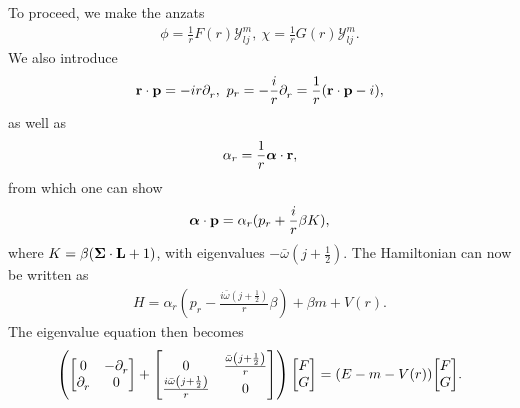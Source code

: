 To proceed, we make the anzats
\begin{align*}
	\phi = \frac{1}{r}F(r)\mathcal{Y}^{m}_{lj},\ \chi = \frac{1}{r}G(r)\mathcal{Y}^{m}_{lj}.
\end{align*}
We also introduce
\begin{align*}
	\vb{r}\cdot\vb{p} = -ir\partial^{}_{r},\ p_{r} = -\frac{i}{r}\partial^{}_{r} = \frac{1}{r}(\vb{r}\cdot\vb{p} - i),
\end{align*}
as well as
\begin{align*}
	\alpha_{r} = \frac{1}{r}\vb*{\alpha}\cdot\vb{r},
\end{align*}
from which one can show
\begin{align*}
	\vb*{\alpha}\cdot\vb{p} = \alpha_{r}(p_{r} + \frac{i}{r}\beta K),
\end{align*}
where $K = \beta(\vb*{\Sigma}\cdot\vb{L} + 1)$, with eigenvalues $-\bar{\omega}\left(j + \frac{1}{2}\right)$. The Hamiltonian can now be written as
\begin{align*}
	H = \alpha_{r}(p_{r} - \frac{i\bar{\omega}\left(j + \frac{1}{2}\right)}{r}\beta) + \beta m + V(r).
\end{align*}
The eigenvalue equation then becomes
\begin{align*}
	\left(\mqty[
		0           & -\del{}{r}{} \\
		\del{}{r}{} & 0
	] + \mqty[
		0                                                   & \frac{\bar{\omega}\left(j + \frac{1}{2}\right)}{r} \\
		\frac{i\bar{\omega}\left(j + \frac{1}{2}\right)}{r} & 0
	]\right)\mqty[
		F \\
		G
	] = (E - m - V(r))\mqty[
		F \\
		G
	].
\end{align*}

